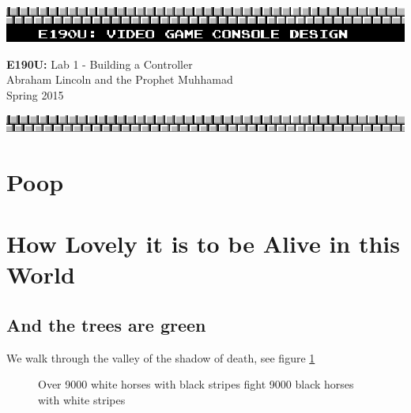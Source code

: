 \documentclass[11pt]{article}
\begin{document}
\begin{center}
\includegraphics[width=\textwidth]{title}

\textbf{E190U:} Lab 1 - Building a Controller\\
Abraham Lincoln and the Prophet Muhhamad\\
Spring 2015

\includegraphics[width=\textwidth]{bottom}
\end{center}


\section{Poop}

\section{How Lovely it is to be Alive in this World}

\subsection{And the trees are green}

We walk through the valley of the shadow of death, see figure \ref{fig:zebras}

\begin{figure}[h!]
\begin{center}
\end{center}
\caption{Over 9000 white horses with black stripes fight 9000 black horses with white stripes}
\label{fig:zebras}
\end{figure}
\end{document}
